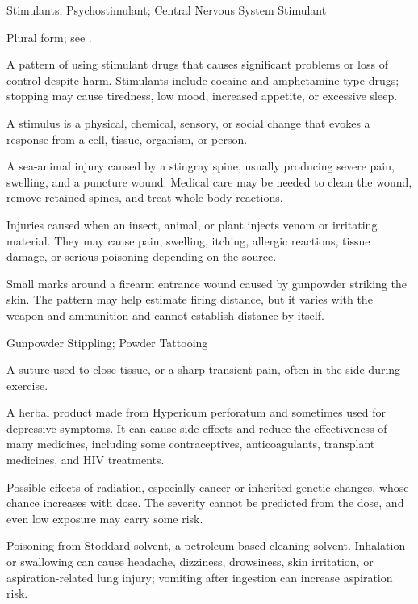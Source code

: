 \synonyms
Stimulants; Psychostimulant; Central Nervous System Stimulant

 Plural form; see .

 A pattern of using stimulant drugs that causes significant problems or loss of control despite harm. Stimulants include cocaine and amphetamine-type drugs; stopping may cause tiredness, low mood, increased appetite, or excessive sleep.

 A stimulus is a physical, chemical, sensory, or social change that evokes a response from a cell, tissue, organism, or person.

 A sea-animal injury caused by a stingray spine, usually producing severe pain, swelling, and a puncture wound. Medical care may be needed to clean the wound, remove retained spines, and treat whole-body reactions.

 Injuries caused when an insect, animal, or plant injects venom or irritating material. They may cause pain, swelling, itching, allergic reactions, tissue damage, or serious poisoning depending on the source.

 Small marks around a firearm entrance wound caused by gunpowder striking the skin. The pattern may help estimate firing distance, but it varies with the weapon and ammunition and cannot establish distance by itself.

\synonyms
Gunpowder Stippling; Powder Tattooing

 A suture used to close tissue, or a sharp transient pain, often in the side during exercise.

 A herbal product made from Hypericum perforatum and sometimes used for depressive symptoms. It can cause side effects and reduce the effectiveness of many medicines, including some contraceptives, anticoagulants, transplant medicines, and HIV treatments.

 Possible effects of radiation, especially cancer or inherited genetic changes, whose chance increases with dose. The severity cannot be predicted from the dose, and even low exposure may carry some risk.

 Poisoning from Stoddard solvent, a petroleum-based cleaning solvent. Inhalation or swallowing can cause headache, dizziness, drowsiness, skin irritation, or aspiration-related lung injury; vomiting after ingestion can increase aspiration risk.

